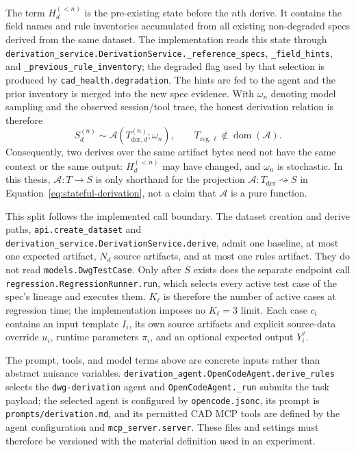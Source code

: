 The term $H_d^{(<n)}$ is the pre-existing state before the $n$th derive. It contains
the field names and rule inventories accumulated from all existing non-degraded specs
derived from the same dataset. The implementation reads this state through
\texttt{derivation\_service.DerivationService.\_reference\_specs},
\texttt{\_field\_hints}, and \texttt{\_previous\_rule\_inventory}; the degraded flag
used by that selection is produced by \texttt{cad\_health.degradation}. The hints are
fed to the agent and the prior inventory is merged into the new spec evidence. With
$\omega_n$ denoting model sampling and the observed session/tool trace, the honest
derivation relation is therefore
\begin{equation}
S_d^{(n)} \sim
\mathcal{A}\!\left(T_{\mathrm{der},d}^{(n)};\omega_n\right),
\qquad
T_{\mathrm{reg},\ell}\notin\operatorname{dom}(\mathcal{A}).
\label{eq:stateful-derivation}
\end{equation}
Consequently, two derives over the same artifact bytes need not have the same context or
the same output: $H_d^{(<n)}$ may have changed, and $\omega_n$ is stochastic. In this
thesis, $\mathcal{A}:T\rightarrow S$ is only shorthand for the projection
$\mathcal{A}:T_{\mathrm{der}}\rightsquigarrow S$ in
Equation~\ref{eq:stateful-derivation}, not a claim that $\mathcal{A}$ is a pure function.

This split follows the implemented call boundary. The dataset creation and derive
paths, \texttt{api.create\_dataset} and
\texttt{derivation\_service.DerivationService.derive}, admit one baseline, at most one
expected artifact, $N_d$ source artifacts, and at most one rules artifact. They do not
read \texttt{models.DwgTestCase}. Only after $S$ exists does the separate endpoint call
\texttt{regression.RegressionRunner.run}, which selects every active test case of the
spec's lineage and executes them. $K_{\ell}$ is therefore the number of active cases at
regression time; the implementation imposes no $K_{\ell}=3$ limit. Each case $c_i$
contains an input template $I_i$, its own source artifacts and explicit source-data
override $u_i$, runtime parameters $\pi_i$, and an optional expected output $Y_i^{?}$.

The prompt, tools, and model terms above are concrete inputs rather than abstract
nuisance variables. \texttt{derivation\_agent.OpenCodeAgent.derive\_rules} selects the
\texttt{dwg-derivation} agent and \texttt{OpenCodeAgent.\_run} submits the task payload;
the selected agent is configured by \texttt{opencode.jsonc}, its prompt is
\texttt{prompts/derivation.md}, and its permitted CAD MCP tools are defined by the agent
configuration and \texttt{mcp\_server.server}. These files and settings must therefore
be versioned with the material definition used in an experiment.

